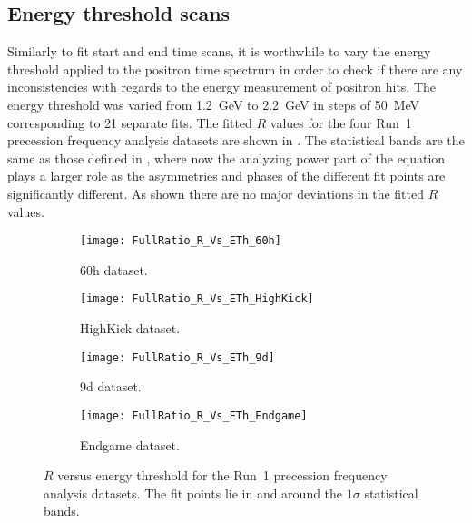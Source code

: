 \subsection{Energy threshold scans}


Similarly to fit start and end time scans, it is worthwhile to vary the energy threshold applied to the positron time spectrum in order to check if there are any inconsistencies with regards to the energy measurement of positron hits. The energy threshold was varied from \SI{1.2}{\GeV} to \SI{2.2}{\GeV} in steps of \SI{50}{\MeV} corresponding to 21 separate fits. The fitted $R$ values for the four Run~1 precession frequency analysis datasets are shown in . The statistical bands are the same as those defined in , where now the analyzing power part of the equation plays a larger role as the asymmetries and phases of the different fit points are significantly different. As shown there are no major deviations in the fitted $R$ values.


\begin{figure}[]
\centering
    \begin{subfigure}[]{0.45\textwidth}
        \centering
        \texttt{[image: FullRatio\_R\_Vs\_ETh\_60h]}
        \caption{60h dataset.}
    \end{subfigure}%
    \begin{subfigure}[]{0.45\textwidth}
        \centering
        \texttt{[image: FullRatio\_R\_Vs\_ETh\_HighKick]}
        \caption{HighKick dataset.}
    \end{subfigure}

    \begin{subfigure}[]{0.45\textwidth}
        \centering
        \texttt{[image: FullRatio\_R\_Vs\_ETh\_9d]}
        \caption{9d dataset.}
    \end{subfigure}%
    \begin{subfigure}[]{0.45\textwidth}
        \centering
        \texttt{[image: FullRatio\_R\_Vs\_ETh\_Endgame]}
        \caption{Endgame dataset.}
    \end{subfigure}
\caption[$R$ versus energy threshold]{$R$ versus energy threshold for the Run~1 precession frequency analysis datasets. The fit points lie in and around the $1\sigma$ statistical bands.}
\label{fig:energyThresholdScan_R}
\end{figure}





